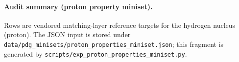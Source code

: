\paragraph{Audit summary (proton property miniset).} \AuditTag Rows are vendored matching-layer reference targets for the hydrogen nucleus (proton). The JSON input is stored under \texttt{data/pdg\_minisets/proton\_properties\_miniset.json}; this fragment is generated by \texttt{scripts/exp\_proton\_properties\_miniset.py}.